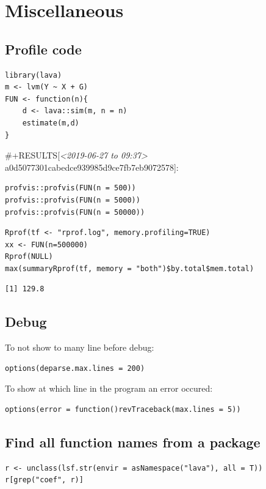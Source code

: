 \documentclass{article}
\begin{document}
\section{Miscellaneous}
\label{sec:orga701cee}
\subsection{Profile code}
\label{sec:orgea1a0ec}

\lstset{language=r,label= ,caption= ,captionpos=b,numbers=none}
\begin{lstlisting}
library(lava)
m <- lvm(Y ~ X + G)
FUN <- function(n){
	d <- lava::sim(m, n = n)
	estimate(m,d)
}
\end{lstlisting}

\#+RESULTS[\textit{<2019-06-27 to 09:37> } a0d5077301cabedce939985d9ce7fb7eb9072578]:

\lstset{language=r,label= ,caption= ,captionpos=b,numbers=none}
\begin{lstlisting}
profvis::profvis(FUN(n = 500))
profvis::profvis(FUN(n = 5000))
profvis::profvis(FUN(n = 50000))
\end{lstlisting}

\lstset{language=r,label= ,caption= ,captionpos=b,numbers=none}
\begin{lstlisting}
Rprof(tf <- "rprof.log", memory.profiling=TRUE)
xx <- FUN(n=500000)
Rprof(NULL)
max(summaryRprof(tf, memory = "both")$by.total$mem.total)
\end{lstlisting}

\begin{verbatim}
[1] 129.8
\end{verbatim}

\subsection{Debug}
\label{sec:org97c3247}
To not show to many line before debug:
\lstset{language=r,label= ,caption= ,captionpos=b,numbers=none}
\begin{lstlisting}
options(deparse.max.lines = 200)
\end{lstlisting}

To show at which line in the program an error occured:
\lstset{language=r,label= ,caption= ,captionpos=b,numbers=none}
\begin{lstlisting}
options(error = function()revTraceback(max.lines = 5))
\end{lstlisting}

\subsection{Find all function names from a package}
\label{sec:org57b0d67}
\lstset{language=r,label= ,caption= ,captionpos=b,numbers=none}
\begin{lstlisting}
r <- unclass(lsf.str(envir = asNamespace("lava"), all = T))
r[grep("coef", r)]
\end{lstlisting}
\end{document}
